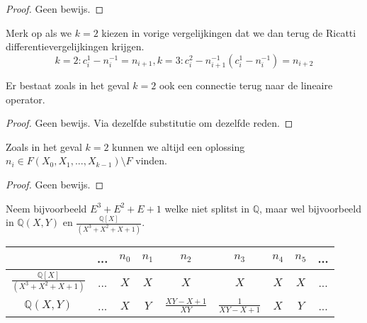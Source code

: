 \documentclass[a4paper,12pt]{article}
\begin{document}
\begin{proof}
    Geen bewijs.
\end{proof}

\begin{remark}
    Merk op als we $k=2$ kiezen in vorige vergelijkingen dat we dan terug de Ricatti differentievergelijkingen krijgen.
    $$
        k =2  : c^1_i - n_{i}^{-1}= n_{i+1}, k=3 : c^2_i - n_{i+1}^{-1} (c^1_i - n_{i}^{-1}) = n_{i+2}
    $$
\end{remark}

\begin{conjecture}
    Er bestaat zoals in het geval $k=2$ ook een connectie terug naar de lineaire operator.
\end{conjecture}

\begin{proof}
    Geen bewijs. Via dezelfde substitutie om dezelfde reden.
\end{proof}

\begin{conjecture}
    Zoals in het geval $k=2$ kunnen we altijd een oplossing $n_i \in F(X_0,X_1,...,X_{k-1}) \setminus F$ vinden.
\end{conjecture}
\begin{proof}
    Geen bewijs.
\end{proof}

\begin{example}
    Neem bijvoorbeeld $E^3+E^2+E+1$ welke niet splitst in $\mathbb{Q}$, maar wel bijvoorbeeld in $\mathbb{Q}(X,Y)$ en
    $\frac{\mathbb{Q}[X]}{(X^3+X^2+X+1)}$.
    \begin{table}[ht]
        \centering
        \begin{tabular}{|c||c|c|c|c|c|c|c|c|} \hline
                                                  & ... & $n_{0}$ & $n_{1}$ & $n_{2}$                   & $n_{3}$                 & $n_{4}$ & $n_{5}$ & ... \\ \hline \hline
            $\frac{\mathbb{Q}[X]}{(X^3+X^2+X+1)}$ & ... & $X$     & $X$     & $X$                       & $X$                     & $X$     & $X$     & ... \\ \hline
            $\mathbb{Q}(X,Y)$                     & ... & $X$     & $Y$     & $\frac{X Y - X + 1}{X Y}$ & $\frac{1}{X Y - X + 1}$ & $X$     & $Y$     & ... \\ \hline
        \end{tabular}
    \end{table}
\end{example}
\end{document}
